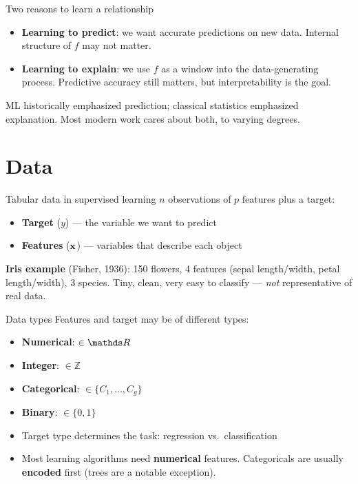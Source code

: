 \documentclass[aspectratio=169]{beamer}
\begin{document}
\begin{frame}{Two reasons to learn a relationship}
  \begin{itemize}
    \item \textbf{Learning to predict}: we want accurate predictions on new data. Internal structure of $f$ may not matter.
    \item \textbf{Learning to explain}: we use $f$ as a window into the data-generating process. Predictive accuracy still matters, but interpretability is the goal.
  \end{itemize}
  \vfill
  ML historically emphasized prediction; classical statistics emphasized explanation. Most modern work cares about both, to varying degrees.
\end{frame}

\section{Data}

\begin{frame}{Tabular data in supervised learning}
  $n$ observations of $p$ features plus a target:
  \vfill
  \begin{itemize}
    \item \textbf{Target} ($y$) — the variable we want to predict
    \item \textbf{Features} ($\mathbf{x}$) — variables that describe each object
  \end{itemize}
  \vfill
  \textbf{Iris example} (Fisher, 1936): 150 flowers, 4 features (sepal length/width, petal length/width), 3 species. Tiny, clean, very easy to classify — \emph{not} representative of real data.
\end{frame}

\begin{frame}{Data types}
  Features and target may be of different types:
  \begin{itemize}
    \item \textbf{Numerical}: $\in \R$
    \item \textbf{Integer}: $\in \mathds{Z}$
    \item \textbf{Categorical}: $\in \{C_1, \dots, C_g\}$
    \item \textbf{Binary}: $\in \{0, 1\}$
  \end{itemize}
  \vfill
  \begin{itemize}
    \item Target type determines the task: regression vs.\ classification
    \item Most learning algorithms need \textbf{numerical} features. Categoricals are usually \textbf{encoded} first (trees are a notable exception).
  \end{itemize}
\end{frame}
\end{document}
